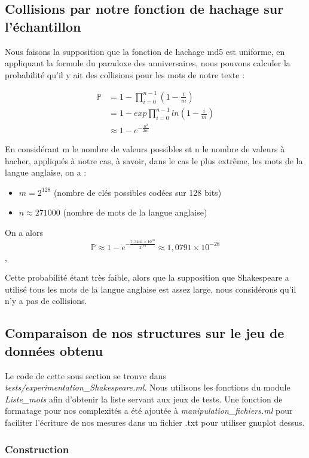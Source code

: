 \documentclass[12pt,a4paper]{article}
\begin{document}
\subsection{Collisions par notre fonction de hachage sur l'échantillon}


Nous faisons la supposition que la fonction de hachage md5 est uniforme, en appliquant la formule du paradoxe des anniversaires, nous pouvons calculer la probabilité qu'il y ait des collisions pour les mots de notre texte :

\begin{align}
\mathbb{P} &= 1 - \prod_{i = 0}^{n -1} ( 1 - \frac{i}{m})\\
&= 1 - exp \prod_{i = 0}^{n -1} ln( 1 - \frac{i}{m})\\
&\approx 1 - e^{-\frac{n^2}{2m}}
\end{align}

En considérant m le nombre de valeurs possibles et n le nombre de valeurs à hacher, appliqués à notre cas, à savoir, dans le cas le plus extrême, les mots de la langue anglaise, on a :

\begin{itemize}
\item $m = 2^{128}$ (nombre de clés possibles codées sur 128 bits)
\item $n \approx 271000$ (nombre de mots de la langue anglaise)
\end{itemize}

On a alors 
$$\mathbb{P}\approx 1 - e^{-\frac{7,3441\times10^{10}}{2^{129}}} \approx 1,0791\times10^{-28}$$,

Cette probabilité étant très faible, alors que la supposition que Shakespeare a utilisé tous les mots de la langue anglaise est assez large, nous considérons qu'il n'y a pas de collisions.

\subsection{Comparaison de nos structures sur le jeu de données obtenu}

Le code de cette sous section se trouve dans \textit{tests/experimentation\_Shakespeare.ml}. Nous utilisons les fonctions du module \textit{Liste\_mots} afin d'obtenir la liste servant aux jeux de tests. Une fonction de formatage pour nos complexités a été ajoutée à \textit{manipulation\_fichiers.ml} pour faciliter l'écriture de nos mesures dans un fichier .txt pour utiliser gnuplot dessus.

\subsubsection{Construction}
\end{document}
